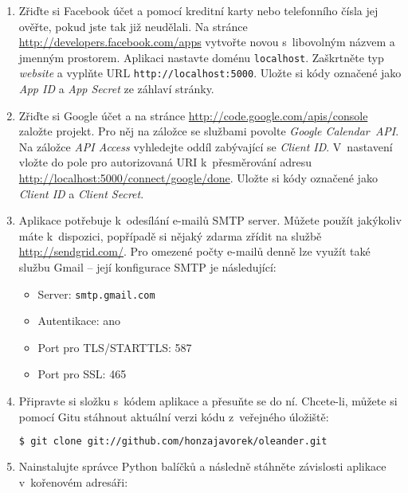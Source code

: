 \documentclass[12pt,oneside,final]{fithesis2}
\begin{document}
\begin{enumerate}
    \item Zřiďte si Facebook účet a pomocí kreditní karty nebo telefonního čísla jej ověřte, pokud jste tak již neudělali. Na stránce \url{http://developers.facebook.com/apps} vytvořte novou  s~libovolným náz\-vem a jmen\-ným pros\-to\-rem. Aplikaci nastavte doménu {\tt localhost}. Zaškrtněte typ \emph{website} a vyplňte URL {\tt http://localhost:5000}. Uložte si kódy označené jako \emph{App ID} a \emph{App Secret} ze záhlaví stránky.

    \item Zřiďte si Google účet a na stránce \url{http://code.google.com/apis/console} založte projekt. Pro něj na záložce se službami povolte \emph{Google Calendar~API}. Na záložce \emph{API Access} vyhledejte oddíl zabývající se \emph{Client ID}. V~nastavení vložte do pole pro autorizovaná URI k~přesměrování adresu \url{http://localhost:5000/connect/google/done}. Uložte si kódy označené jako \emph{Client ID} a \emph{Client Secret}.

    \item Aplikace potřebuje k~odesílání e-mailů SMTP server. Můžete použít jakýkoliv máte k~dispozici, popřípadě si nějaký zdarma zřídit na službě \url{http://sendgrid.com/}. Pro omezené počty e-mailů denně lze využít také službu Gmail -- její konfigurace SMTP je následující:

        \begin{itemize}
            \item Server: {\tt smtp.gmail.com}
            \item Autentikace: ano
            \item Port pro TLS/STARTTLS: 587
            \item Port pro SSL: 465
        \end{itemize}

    \item Připravte si složku s~kódem aplikace a přesuňte se do ní. Chcete-li, můžete si pomocí Gitu stáhnout aktuální verzi kódu z~veřejného úložiště:

        \begin{lstlisting}[language=bash]
$ git clone git://github.com/honzajavorek/oleander.git
        \end{lstlisting}

    \item Nainstalujte správce Python balíčků a následně stáhněte závislosti aplikace v~kořenovém adresáři:


\end{enumerate}
\end{document}
